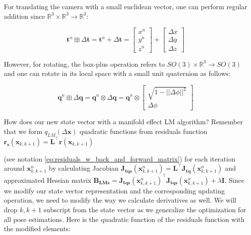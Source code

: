 \documentclass[a4paper]{report}
\numberwithin{figure}{section}
\newcommand{\R}{\mathbb{R}}
\begin{document}
\begin{appendices}
For translating the camera with a small euclidean vector, 
one can perform regular addition since $\R^3 \times \R^3 \rightarrow \R^3$:

\begin{equation}
  \mathbf{t}^n \boxplus \Delta \mathbf{t} = 
  \mathbf{t}^n + \Delta \mathbf{t} =
  \begin{bmatrix} x^{n} \\ y^{n} \\ z^{n} \end{bmatrix} + 
  \begin{bmatrix} \Delta x \\ \Delta y \\ \Delta z \end{bmatrix}
\end{equation}

However, for rotating, the box-plus operation refers to 
$SO(3) \times \R^3 \rightarrow SO(3)$ and one can rotate in its local space 
with a small unit quaternion as follows:

\begin{equation}
  \mathbf{q}^n \boxplus \Delta \mathbf{q} = 
  \mathbf{q}^n \otimes \Delta \mathbf{q} = 
  \mathbf{q}^n \otimes 
  \begin{bmatrix} \sqrt{1-||\Delta \phi||^2} \\ \Delta \phi \end{bmatrix}
\end{equation}

How does our new state vector with a manifold effect LM algorithm? 
Remember that we form $q_{LM}(\Delta \mathbf{x})$ quadratic functions 
from residuals function 
$\mathbf{r_s}(\mathbf{x}_{k,k+1})=\mathbf{L}^\top\mathbf{r}(\mathbf{x}_{k,k+1})$
 
(see notation \eqref{eq:residuals_w_back_and_forward_matrix})
for each iteration around $\mathbf{x}^n_{k,k+1}$ by calculating Jacobian 
$\mathbf{J_{tqs}}(\mathbf{x}^n_{k,k+1})=\mathbf{L}^\top\mathbf{J_{tq}}(\mathbf{x}^n_{k,k+1})$
and 
approximated Hessian matrix 
$\mathbf{B_{LMs}}=\mathbf{J_{tqs}}(\mathbf{x}^n_{k,k+1})^\top\mathbf{J_{tqs}}(\mathbf{x}^n_{k,k+1})
 + \lambda \mathbf{I}$.
Since we modify our state vector representation 
and the corresponding updating operation, we need to modify the way we calculate 
derivatives as well. We will drop $k,k+1$ subscript from the state vector 
as we generalize the 
optimization for all pose estimations. 
Here is the quadratic function of the residuals function with the modified elements:


\end{appendices}
\end{document}
